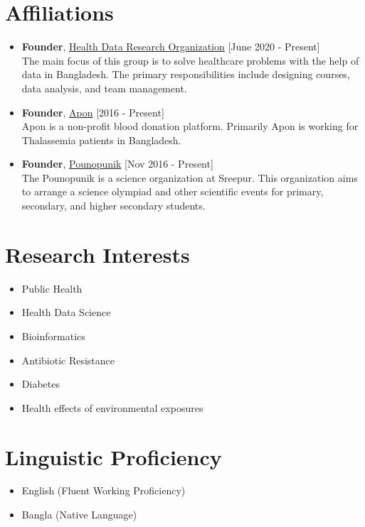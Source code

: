 \documentclass[11pt,a4paper]{moderncv}
\begin{document}
\section{Affiliations}
\begin{itemize}
	\item \textbf{Founder}, 
	\textcolor{blue}{\href{https://hdrobd.org/}{Health Data Research 
	Organization}}
	\hfill [June 2020 - Present]\\ 
	The main focus of this group is to solve healthcare problems with the help 
	of data in Bangladesh. The primary responsibilities include designing 
	courses, data analysis, and team management.
	\item \textbf{Founder}, 
	\textcolor{blue}{\href{}{Apon}}
	\hfill [2016 - Present]\\
	Apon is a non-profit blood donation platform. Primarily Apon is working for 
	Thalassemia patients in Bangladesh.
	\item \textbf{Founder}, 
	\textcolor{blue}{\href{}{Pounopunik}}
	\hfill [Nov 2016 - Present]\\
	The Pounopunik is a science organization at Sreepur. This organization aims 
	to arrange a science olympiad and other scientific events for primary, 
	secondary, and higher secondary students. 

\end{itemize}

\section{Research Interests}

\begin{multicols}{2}
	\begin{itemize}
		\item Public Health
		\item Health Data Science
		\item Bioinformatics
	\end{itemize}
	\columnbreak 
	\begin{itemize}
		\item Antibiotic Resistance
		\item Diabetes
		\item Health effects of environmental exposures 
	\end{itemize}

\end{multicols} 

\section{Linguistic Proficiency}
\begin{itemize}  	
	\item English (Fluent Working Proficiency)
	\item Bangla (Native Language)
\end{itemize}
\end{document}
